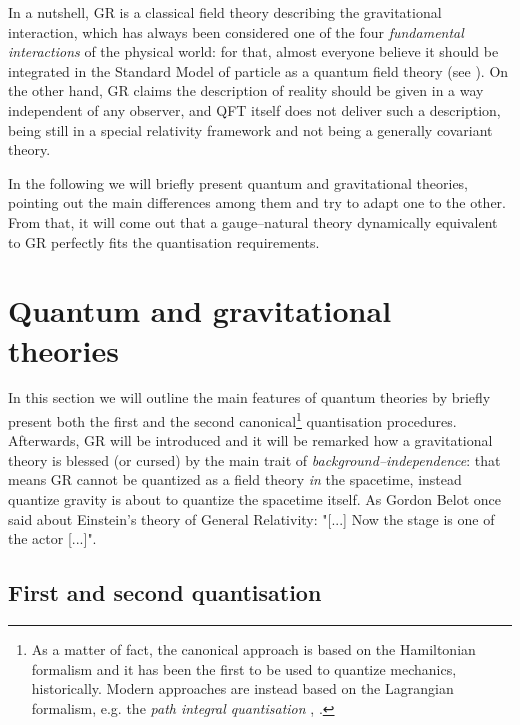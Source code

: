 
In a nutshell, GR is a classical field theory describing the gravitational interaction, which has always been considered one of the four \emph{fundamental interactions} of the physical world: for that, almost everyone believe it should be integrated in the Standard Model of particle as a quantum field theory (see \cite{symmetries}). On the other hand, GR claims the description of reality should be given in a way independent of any observer, and QFT itself does not deliver such a description, being still in a special relativity framework and not being a generally covariant theory.

In the following we will briefly present quantum and gravitational theories, pointing out the main differences among them and try to adapt one to the other. From that, it will come out that a gauge--natural theory dynamically equivalent to GR perfectly fits the quantisation requirements.



\section{Quantum and gravitational theories}

In this section we will outline the main features of quantum theories by briefly present both the first and the second canonical\footnote{As a matter of fact, the canonical approach is based on the Hamiltonian formalism and it has been the first to be used to quantize mechanics, historically. Modern approaches are instead based on the Lagrangian formalism, e.g. the \emph{path integral quantisation} \cite{pathint1}, \cite{pathint2}.} quantisation procedures. Afterwards, GR will be introduced and it will be remarked how a gravitational theory is blessed (or cursed) by the main trait of \emph{background--independence}: that means GR cannot be quantized as a field theory \emph{in} the spacetime, instead quantize gravity is about to quantize the spacetime itself. As Gordon Belot once said about Einstein's theory of General Relativity: "[...] Now the stage is one of the actor [...]".


\subsection{First and second quantisation}


